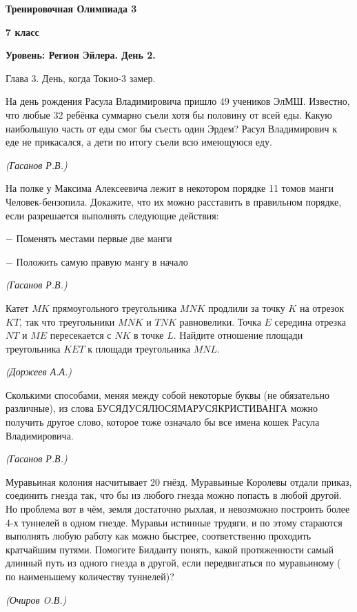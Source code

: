 \centerline{\Huge \bf  Тренировочная Олимпиада 3}
\centerline{\Huge \bf 7 класс}
\centerline{\Huge \bf Уровень: Регион Эйлера. День 2.}

\begin{flushright}
    \scriptsize{Глава 3. День, когда Токио-3 замер.}
\end{flushright}


На день рождения Расула Владимировича пришло 49 учеников ЭлМШ. Известно, что любые 32 ребёнка суммарно съели хотя бы половину от всей еды. Какую наибольшую часть от еды смог бы съесть один Эрдем? Расул Владимирович к еде не прикасался, а дети по итогу съели всю имеющуюся еду.
\begin{flushright}
    \textit{\small{(Гасанов Р.В.)}}
\end{flushright}

На полке у Максима Алексеевича лежит в некотором порядке 11 томов манги Человек-бензопила. Докажите, что их можно расставить в правильном порядке, если разрешается выполнять следующие действия:

$-$ Поменять местами первые две манги

$-$ Положить самую правую мангу в начало
\begin{flushright}
    \textit{\small{(Гасанов Р.В.)}}
\end{flushright}

Катет $MK$ прямоугольного треугольника $MNK$ продлили за точку $K$ на отрезок $KT$, так что треугольники $MNK$ и $TNK$ равновелики. Точка $E$ середина отрезка $NT$ и $ME$ пересекается с $NK$ в точке $L$. Найдите отношение площади треугольника $KET$ к площади треугольника $MNL$.
\begin{flushright}
    \textit{\small{(Доржеев А.А.)}}
\end{flushright}

Сколькими способами, меняя между собой некоторые буквы (не обязательно различные), из слова БУСЯДУСЯЛЮСЯМАРУСЯКРИСТИВАНГА можно получить другое слово, которое тоже означало бы все имена кошек Расула Владимировича.
\begin{flushright}
    \textit{\small{(Гасанов Р.В.)}}
\end{flushright}

Муравьиная колония насчитывает 20 гнёзд. Муравьиные Королевы отдали приказ, соединить гнезда так, что бы из любого гнезда можно попасть в любой другой. Но проблема вот в чём, земля достаточно рыхлая, и невозможно построить более 4-х туннелей в одном гнезде. Муравьи истинные трудяги, и по этому стараются выполнять любую работу как можно быстрее, соответственно проходить кратчайшим путями. Помогите Билданту понять, какой протяженности самый длинный путь из одного гнезда в другой, если передвигаться по муравьиному ( по наименьшему количеству туннелей)?
\begin{flushright}
    \textit{\small{(Очиров O.В.)}}
\end{flushright}
